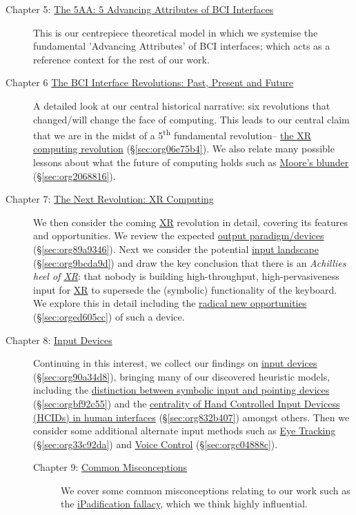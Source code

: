 \documentclass[logo,bsc,singlespacing,parskip]{infthesis}
\begin{document}
\begin{description}
\item[{Chapter 5: \hyperref[sec:org87adf04]{The 5AA: 5 Advancing Attributes of BCI Interfaces}}] This is our centrepiece theoretical model in which we systemise the fundamental 'Advancing Attributes' of BCI interfaces; which acts as a reference context for the rest of our work.

\item[{Chapter 6 \hyperref[sec:orgf9a6f3f]{The BCI Interface Revolutions: Past, Present and Future}}] A detailed look at our central historical narrative: six revolutions that changed/will change the face of computing.
This leads to our central claim that we are in the midst of a 5\textsuperscript{th} fundamental revolution-- \hyperref[sec:org06e75b4]{the XR computing revolution} (\S \ref{sec:org06e75b4}).
We also relate many possible lessons about what the future of computing holds such as \hyperref[sec:org2068816]{Moore's blunder} (\S \ref{sec:org2068816}).

\item[{Chapter 7: \hyperref[sec:orgaa60e10]{The Next Revolution: XR Computing}}] We then consider the coming \hyperref[org88b0f70]{XR} revolution in detail, covering its features and opportunities.
We review the expected \hyperref[sec:org89a9346]{output paradigm/devices} (\S \ref{sec:org89a9346}).
Next we consider the potential \hyperref[sec:org9bcda9d]{input landscape} (\S \ref{sec:org9bcda9d}) and draw the key conclusion that there is an \emph{Achillies heel of \hyperref[org88b0f70]{XR}}: that nobody is building high-throughput, high-pervasiveness input for \hyperref[org88b0f70]{XR} to supersede the (symbolic) functionality of the keyboard.
We explore this in detail including the \hyperref[sec:orged605cc]{radical new opportunities} (\S \ref{sec:orged605cc}) of such a device.

\item[{Chapter 8: \hyperref[sec:org90a34d8]{Input Devices}}] Continuing in this interest, we collect our findings on \hyperref[sec:org90a34d8]{input devices} (\S \ref{sec:org90a34d8}), bringing many of our discovered heuristic models, including the \hyperref[sec:orgbf92c55]{distinction between symbolic input and pointing devices} (\S \ref{sec:orgbf92c55}) and the \hyperref[sec:org832b407]{centrality of Hand Controlled Input Devicess (HCIDs) in human interfaces} (\S \ref{sec:org832b407}) amongst others.
Then we consider some additional alternate input methods such as \hyperref[sec:org33c92da]{Eye Tracking} (\S \ref{sec:org33c92da}) and \hyperref[sec:orgc04888c]{Voice Control} (\S \ref{sec:orgc04888c}).

\begin{description}
\item[{Chapter 9: \hyperref[sec:org5797988]{Common Misconceptions}}] We cover some common misconceptions relating to our work such as the \hyperref[ipadification fallacy]{iPadification fallacy}, which we think highly influential.
\end{description}
\end{description}
\end{document}
